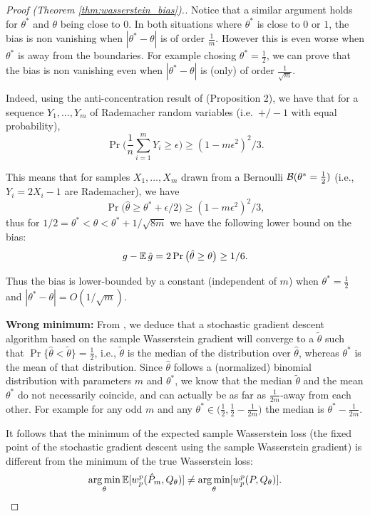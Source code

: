 \documentclass{article}
\begin{document}
\begin{proof}[Proof (Theorem \ref{thm:wasserstein_bias}).]
Notice that a similar argument holds for $\theta^*$ and $\theta$ being close to $0$. In both situations where $\theta^*$ is close to $0$ or $1$, the bias is non vanishing when $|\theta^*-\theta|$ is of order $\tfrac{1}{m}$. However this is even worse when $\theta^*$ is away from the boundaries. For example chosing $\theta^*=\tfrac{1}{2}$, we can prove that the bias is non vanishing even when $|\theta^*-\theta|$ is (only) of order $\tfrac{1}{\sqrt{m}}$.

Indeed, using the anti-concentration result of \cite{Veraar2010} (Proposition 2), we have that for a sequence $Y_1,\dots,Y_m$ of Rademacher random variables (i.e.~$+/-1$ with equal probability),
$$\Pr\Big(\frac 1n\sum_{i=1}^m Y_i \geq \epsilon\Big) \geq (1-m\epsilon^2)^2/3.$$

This means that for samples $X_1,\dots,X_m$ drawn from a Bernoulli ${\cal B}(\theta^*=\tfrac{1}{2})$ (i.e., $Y_i=2X_i-1$ are Rademacher), we have
$$\Pr\Big(\hat \theta \geq \theta^* + \epsilon/2\Big) \geq (1-m\epsilon^2)^2/3,$$
thus for $1/2 = \theta^*<\theta<\theta^*+1/\sqrt{8m}$ we have the following lower bound on the bias:
$$g - \expect \hat g = 2 \Pr \big( \hat \theta \geq \theta\big) \geq 1/6.$$

Thus the bias is lower-bounded by a constant (independent of $m$) when $\theta^*=\tfrac{1}{2}$ and $|\theta^*-\theta|=O(1/\sqrt{m})$. 

{\bf Wrong minimum:}
From , we deduce that a stochastic gradient descent algorithm based on the sample Wasserstein gradient will converge to a $\tilde \theta$ such that $\Pr\{\hat \theta < \tilde \theta\}=\tfrac{1}{2}$, i.e., $\tilde\theta$ is the median of the distribution over $\hat \theta$, whereas $\theta^*$ is the mean of that distribution. Since $\hat \theta$ follows a (normalized) binomial distribution with parameters $m$ and $\theta^*$, we know that the median $\tilde\theta$ and the mean $\theta^*$ do not necessarily coincide, and can actually be as far as $\frac{1}{2m}$-away from each other. For example for any odd $m$ and any $\theta^*\in \big(\tfrac{1}{2}, \tfrac{1}{2} - \tfrac{1}{2m} \big)$ the median is $\theta^*-\tfrac{1}{2m}$.


It follows that the minimum of the expected sample Wasserstein loss (the fixed point of the stochastic gradient descent using the sample Wasserstein gradient) is different from the minimum of the true Wasserstein loss:
\begin{equation*}
\argmin_{\theta} \expects [ w^p_p(\hat P_m, Q_{\theta}) ] \neq \argmin_{\theta} [w^p_p(P, Q_{\theta})].
\end{equation*}


\end{proof}
\end{document}
